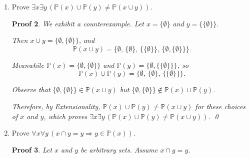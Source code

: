 \documentclass[12pt]{article}
\newcommand{\Pow}{\mathbb{P}}
\theoremstyle{proofstyle}
\newtheorem*{proof*}{Proof}
\begin{document}
\begin{enumerate}[left=0pt, itemsep=2em, parsep=1em]
\begin{enumerate}[label=(\alph*), itemsep=1.5em, leftmargin=2em]
\begin{proof*}
\begin{quote}
        \textit{Case 2:} Suppose $w \in \Pow(y)$.

        \begin{quote}
            By the definition of power set, $w \subseteq y$.

            Since $x \cup y = y \cup x$ by commutativity of union, and $y \subseteq y \cup x = x \cup y$ by Problem 1c of PS3, we have $y \subseteq x \cup y$.

            By Problem 1a of PS3 (transitivity of $\subseteq$), $w \subseteq x \cup y$.

            Thus $w \in \Pow(x \cup y)$ by the definition of power set.
        \end{quote}

        In both cases, $w \in \Pow(x \cup y)$.
    \end{quote}

    Therefore $\Pow(x) \cup \Pow(y) \subseteq \Pow(x \cup y)$. \qed
\end{proof*}

\item Prove $\exists x \exists y\,(\Pow(x) \cup \Pow(y) \neq \Pow(x \cup y))$.

\begin{proof*}
    We exhibit a counterexample. Let $x = \{\emptyset\}$ and $y = \{\{\emptyset\}\}$.

    Then $x \cup y = \{\emptyset, \{\emptyset\}\}$, and
    \[
        \Pow(x \cup y) = \bigl\{\emptyset,\,\{\emptyset\},\,\{\{\emptyset\}\},\,\{\emptyset,\{\emptyset\}\}\bigr\}.
    \]

    Meanwhile $\Pow(x) = \{\emptyset, \{\emptyset\}\}$ and $\Pow(y) = \{\emptyset, \{\{\emptyset\}\}\}$, so
    \[
        \Pow(x) \cup \Pow(y) = \bigl\{\emptyset,\,\{\emptyset\},\,\{\{\emptyset\}\}\bigr\}.
    \]

    Observe that $\{\emptyset, \{\emptyset\}\} \in \Pow(x \cup y)$ but $\{\emptyset, \{\emptyset\}\} \notin \Pow(x) \cup \Pow(y)$.

    Therefore, by Extensionality, $\Pow(x) \cup \Pow(y) \neq \Pow(x \cup y)$ for these choices of $x$ and $y$, which proves $\exists x \exists y\,(\Pow(x) \cup \Pow(y) \neq \Pow(x \cup y))$. \qed
\end{proof*}
\newpage
\item Prove $\forall x \forall y\,(x \cap y = y \Rightarrow y \in \Pow(x))$.

\begin{proof*}
    Let $x$ and $y$ be arbitrary sets. Assume $x \cap y = y$.


\end{proof*}
\end{enumerate}
\end{enumerate}
\end{document}
